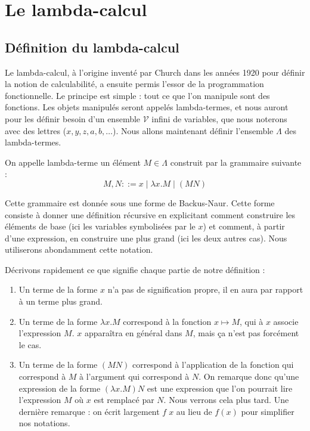 \section[Lambda-calcul]{Le lambda-calcul}

\subsection{Définition du lambda-calcul}

Le lambda-calcul, à l'origine inventé par Church dans les années 1920 pour définir la notion de calculabilité, a ensuite permis l'essor de la programmation fonctionnelle. Le principe est simple : tout ce que l'on manipule sont des fonctions. Les objets manipulés seront appelés lambda-termes, et nous auront pour les définir besoin d'un ensemble $\mathcal V$ infini de variables, que nous noterons avec des lettres ($x,y,z,a,b,\ldots$). Nous allons maintenant définir l'ensemble $\Lambda$ des lambda-termes.

\begin{defi}
    On appelle lambda-terme un élément $M\in\Lambda$ construit par la grammaire suivante : $$M,N ::= x\mid \lambda x. M\mid (M N)$$
    
    Cette grammaire est donnée sous une forme de Backus-Naur. Cette forme consiste à donner une définition récursive en explicitant comment construire les éléments de base (ici les variables symbolisées par le $x$) et comment, à partir d'une expression, en construire une plus grand (ici les deux autres cas). Nous utiliserons abondamment cette notation.
\end{defi}

Décrivons rapidement ce que signifie chaque partie de notre définition :
\begin{enumerate}
    \item Un terme de la forme $x$ n'a pas de signification propre, il en aura par rapport à un terme plus grand.
    \item Un terme de la forme $\lambda x. M$ correspond à la fonction $x\mapsto M$, qui à $x$ associe l'expression $M$. $x$ apparaîtra en général dans $M$, mais ça n'est pas forcément le cas.
    \item Un terme de la forme $(M N)$ correspond à l'application de la fonction qui correspond à $M$ à l'argument qui correspond à $N$. On remarque donc qu'une expression de la forme $(\lambda x.M) N$ est une expression que l'on pourrait lire \og l'expression $M$ où $x$ est remplacé par $N$\fg{}. Nous verrons cela plus tard. Une dernière remarque : on écrit largement $f\; x$ au lieu de $f(x)$ pour simplifier nos notations.
\end{enumerate}

